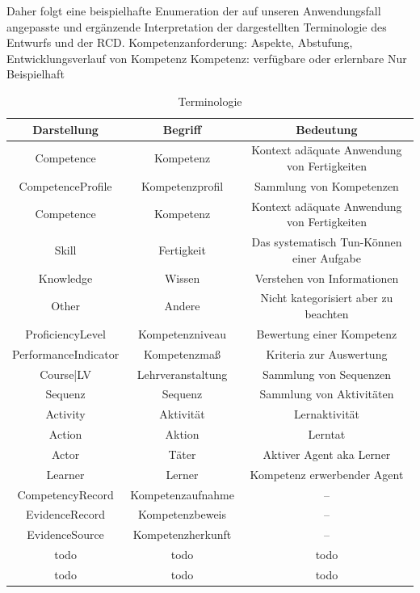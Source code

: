 \documentclass[
12pt,
english,
ngerman,
headsepline,
twoside,
openright,
numbers=noenddot,version=first
]{scrreprt}
\providecommand{\tabularnewline}{\\}
\begin{document}
Daher folgt eine beispielhafte Enumeration der auf unseren Anwendungsfall angepasste und ergänzende Interpretation der dargestellten Terminologie des Entwurfs und der RCD.
Kompetenzanforderung:
Aspekte, Abstufung, Entwicklungsverlauf von Kompetenz
Kompetenz: verfügbare oder erlernbare
Nur Beispielhaft
\begin{table}[H]
\caption{Terminologie}


\noindent \centering{}\begin{tabular}{ccc}
\hline
\noalign{\vskip\doublerulesep}
Darstellung & Begriff & Bedeutung\tabularnewline[\doublerulesep]
\hline
\noalign{\vskip\doublerulesep}
Competence & Kompetenz & Kontext adäquate Anwendung von Fertigkeiten \tabularnewline[\doublerulesep]
\noalign{\vskip\doublerulesep}
CompetenceProfile & Kompetenzprofil & Sammlung von Kompetenzen \tabularnewline[\doublerulesep]
\noalign{\vskip\doublerulesep}
Competence & Kompetenz & Kontext adäquate Anwendung von Fertigkeiten \tabularnewline[\doublerulesep]
\noalign{\vskip\doublerulesep}
Skill & Fertigkeit & Das systematisch Tun-Können einer Aufgabe \tabularnewline[\doublerulesep]
\noalign{\vskip\doublerulesep}
Knowledge & Wissen & Verstehen von Informationen
\tabularnewline[\doublerulesep]
\noalign{\vskip\doublerulesep}
Other & Andere & Nicht kategorisiert aber zu beachten
\tabularnewline[\doublerulesep]
\noalign{\vskip\doublerulesep}
ProficiencyLevel & Kompetenzniveau & Bewertung einer Kompetenz
\tabularnewline[\doublerulesep]
\noalign{\vskip\doublerulesep}
PerformanceIndicator & Kompetenzmaß & Kriteria zur Auswertung
\tabularnewline[\doublerulesep]
\noalign{\vskip\doublerulesep}
Course|LV & Lehrveranstaltung & Sammlung von Sequenzen
\tabularnewline[\doublerulesep]
\noalign{\vskip\doublerulesep}
Sequenz & Sequenz & Sammlung von Aktivitäten
\tabularnewline[\doublerulesep]
\noalign{\vskip\doublerulesep}
Activity & Aktivität & Lernaktivität
\tabularnewline[\doublerulesep]
\noalign{\vskip\doublerulesep}
Action & Aktion & Lerntat
\tabularnewline[\doublerulesep]
\noalign{\vskip\doublerulesep}
Actor & Täter & Aktiver Agent aka Lerner
\tabularnewline[\doublerulesep]
\noalign{\vskip\doublerulesep}
Learner & Lerner & Kompetenz erwerbender Agent
\tabularnewline[\doublerulesep]
\noalign{\vskip\doublerulesep}
CompetencyRecord & Kompetenzaufnahme & --
\tabularnewline[\doublerulesep]
\noalign{\vskip\doublerulesep}
EvidenceRecord & Kompetenzbeweis & --
\tabularnewline[\doublerulesep]
\noalign{\vskip\doublerulesep}
EvidenceSource & Kompetenzherkunft & --
\tabularnewline[\doublerulesep]
\noalign{\vskip\doublerulesep}
todo & todo & todo
\tabularnewline[\doublerulesep]
\noalign{\vskip\doublerulesep}
todo & todo & todo
\tabularnewline[\doublerulesep]
\hline
\end{tabular}
\end{table}
\end{document}
